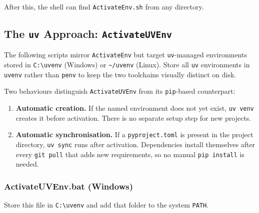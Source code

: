 After this, the shell can find \texttt{ActivateEnv.sh} from any directory.

\subsection{The \texttt{uv} Approach: \texttt{ActivateUVEnv}}
\label{subsec:activateuvenv}

The following scripts mirror \texttt{ActivateEnv} but target
\texttt{uv}-managed environments stored in
\texttt{C:\textbackslash uvenv} (Windows) or
\texttt{\textasciitilde/uvenv} (Linux). Store all \texttt{uv}
environments in \texttt{uvenv} rather than \texttt{penv} to keep the
two toolchains visually distinct on disk.

Two behaviours distinguish \texttt{ActivateUVEnv} from its
\texttt{pip}-based counterpart:

\begin{enumerate}
  \item \textbf{Automatic creation.} If the named environment does not
        yet exist, \texttt{uv venv} creates it before activation. There
        is no separate setup step for new projects.
  \item \textbf{Automatic synchronisation.} If a
        \texttt{pyproject.toml} is present in the project directory,
        \texttt{uv sync} runs after activation. Dependencies install
        themselves after every \texttt{git pull} that adds new
        requirements, so no manual \texttt{pip install} is needed.
\end{enumerate}

\subsubsection{ActivateUVEnv.bat (Windows)}

Store this file in \texttt{C:\textbackslash uvenv} and add that folder
to the system \texttt{PATH}.


